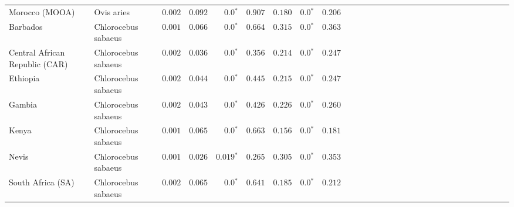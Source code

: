 \begin{center}
\begin{adjustbox}{width = 1\textwidth}
\begin{tabular}{|l|l|r|r|r|r|r|r|r|r|r|r|r|r|r|r|r|r|r|r|r|r|r|r|r|r|r|r|r|}
                 Morocco (MOOA) &           Ovis aries &           $ 0.002$ &                      $ 0.092$ &                  $\bm{0.0{^*}}$ &                                           $ 0.907$ &                      $ 0.180$ &                  $\bm{0.0{^*}}$ &                                           $ 0.206$ \\
                       Barbados &  Chlorocebus sabaeus &           $ 0.001$ &                      $ 0.066$ &                  $\bm{0.0{^*}}$ &                                           $ 0.664$ &                      $ 0.315$ &                  $\bm{0.0{^*}}$ &                                           $ 0.363$ \\
 Central African Republic (CAR) &  Chlorocebus sabaeus &           $ 0.002$ &                      $ 0.036$ &                  $\bm{0.0{^*}}$ &                                           $ 0.356$ &                      $ 0.214$ &                  $\bm{0.0{^*}}$ &                                           $ 0.247$ \\
                       Ethiopia &  Chlorocebus sabaeus &           $ 0.002$ &                      $ 0.044$ &                  $\bm{0.0{^*}}$ &                                           $ 0.445$ &                      $ 0.215$ &                  $\bm{0.0{^*}}$ &                                           $ 0.247$ \\
                         Gambia &  Chlorocebus sabaeus &           $ 0.002$ &                      $ 0.043$ &                  $\bm{0.0{^*}}$ &                                           $ 0.426$ &                      $ 0.226$ &                  $\bm{0.0{^*}}$ &                                           $ 0.260$ \\
                          Kenya &  Chlorocebus sabaeus &           $ 0.001$ &                      $ 0.065$ &                  $\bm{0.0{^*}}$ &                                           $ 0.663$ &                      $ 0.156$ &                  $\bm{0.0{^*}}$ &                                           $ 0.181$ \\
                          Nevis &  Chlorocebus sabaeus &           $ 0.001$ &                      $ 0.026$ &               $\bm{ 0.019{^*}}$ &                                           $ 0.265$ &                      $ 0.305$ &                  $\bm{0.0{^*}}$ &                                           $ 0.353$ \\
              South Africa (SA) &  Chlorocebus sabaeus &           $ 0.002$ &                      $ 0.065$ &                  $\bm{0.0{^*}}$ &                                           $ 0.641$ &                      $ 0.185$ &                  $\bm{0.0{^*}}$ &                                           $ 0.212$ \\

\end{tabular}
\end{adjustbox}
\end{center}
